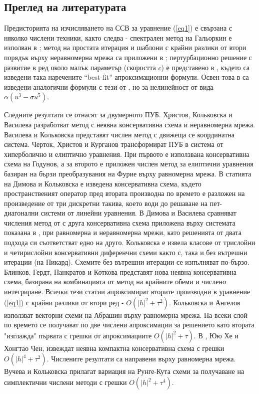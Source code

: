 \documentclass[a5paper]{article}
\newcommand{\rf}[1]{(\ref{#1})}
\theoremstyle{remark}
\begin{document}
\begin{normalsize}
\subsection{Преглед на литературата}
Предисторията на изчисляването на ССВ за уравнение \rf{eq1} е свързана с няколко числени техники, както следва - спектрален метод на Гальоркин е изполван в \cite{ref14,ref13}; метод на простата итерация и шаблони с крайни разлики от втори порядък върху неравномерна мрежа са приложени в \cite{ref117,ref116}; пертурбационно решение с развитие в ред около малък параметър (скоростта $c$) е представено в \cite{ref15}, където са изведени така наречените ``best-fit'' апроксимационни формули. Освен това в \cite{ref159} са изведени аналогични формули с тези от \cite{ref15}, но за нелинейност от вида $\alpha(u^3 - \sigma u^5)$.

Следните резултати се отнасят за двумерното ПУБ.
Христов, Кольковска и Василева \cite{ref20} разработват метод с неявна консервативна схема и неравномерна мрежа. Василева и Кольковска \cite{ref200} представят числен метод с движеща се координатна система. Черток, Христов и Курганов \cite{ref21} трансформират ПУБ в система от хиперболично и елиптично уравнения. При първото е използвана консервативна схема на Годунов, а за второто е приложен числен метод за елиптични уравнения базиран на бързи преобразувания на Фурие върху равномерна мрежа. В статията \cite{ref241} на Димова и Кольковска е изведена консервативна схема, където пространственият оператор пред втората производна по времето е разложен на произведение от три дискретни такива, което води до решаване на пет-диагонални системи от линейни уравнения. В \cite{ref23} Димова и Василева сравняват числения метод от \cite{ref241} с друга консервативна схема приложена върху системата показана в \cite{ref21}, при равномерна и неравномерна мрежи, като решенията от двата подхода си съответстват едно на друго. Кольковска \cite{ref25, ref251, ref252} е извела класове от трислойни и четирислойни консервативни диференчни схеми както с, така и без вътрешни итерации (на Пикард). Схемите без вътрешни итерации се изпълняват по-бързо. Блинков, Гердт, Панкратов и Коткова \cite{ref253} представят нова неявна консервативна схема, базирана на комбинацията от метод на крайните обеми и числено интегриране. Всички тези статии \cite{ref20, ref21, ref241, ref23, ref25, ref251, ref252, ref253} апроксимират вторите производни в уравнение \rf{eq1} с крайни разлики от втори ред - $O(|h|^2 + \tau^2)$. Кольковска и Ангелов \cite{ref22} използват векторни схеми на Абрашин върху равномерна мрежа. На всеки слой по времето се получават по две числени апроксимации за решението като втората "изглажда" първата с грешки от апроксимациите $O(|h|^2 + \tau)$. В \cite{ref24}, Юю Хе и Хонгтао Чен, извеждат неявна компактна консервативна схема с грешки $O(|h|^4 + \tau^2)$. Числените резултати са направени върху равномерна мрежа. Вучева и Кольковска \cite{ref254} прилагат вариация на Рунге-Кута схеми за получаване на симплектични числени методи с грешки $O(|h|^2 + \tau^4)$. 


\end{normalsize}
\end{document}

